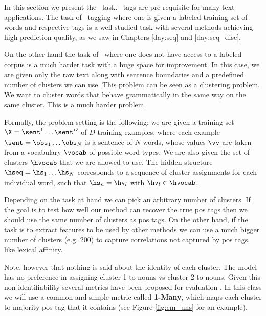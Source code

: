 In this section we present the \posi\ task. \pos\ tags are pre-requisite for many text applications. The task of \pos\ tagging where one is given a labeled training set of words and respective tags is a well studied task with several methods achieving high prediction quality, as we saw in Chapters \ref{day:seq} and \ref{day:seq_disc}. 

On the other hand the task of \posi\ where one does not have access to a labeled corpus is a much harder task with a huge space for improvement. In this case, we are given only the raw text along with sentence boundaries and a predefined number of clusters we can use. This problem can be seen as a clustering problem. We want to cluster words that behave grammatically in the same way on the same cluster. This is a much harder problem.

Formally, the problem setting is the following: we are given a training set $\X = \sent^1 \ldots \sent^D$ of $D$ training examples, where each example $\sent = \obs_1 \ldots \obs_N$ is a sentence of $N$ words, whose values $\vv$ are taken from a vocabulary $\vocab$ of possible word types. We are also given the set of clusters $\hvocab$ that we are allowed to use. The hidden structure $\hseq = \hs_1 \ldots \hs_N$ corresponds to a sequence of cluster assignments for each individual word, such that $\hs_n = \hv_l$ with $\hv_l \in \hvocab$. 

Depending on the task at hand we can pick an arbitrary number of clusters. If the goal is to test how well our method can recover the true pos tags then we should use the same number of clusters as pos tags. On the other hand, if the task is to extract features to be used by other methods we can use a much bigger number of clusters (e.g. 200) to capture correlations not captured by pos tags, like lexical affinity. 

Note, however that nothing is said about the identity of each cluster. The model has no preference in assigning cluster 1 to nouns vs cluster 2 to nouns. Given this non-identifiability several metrics have been proposed for evaluation \citep{Reichart09,haghighi2006naacl,Meila07,RosenbergH07}. In this class we will use a common and simple metric called \textbf{1-Many}, which maps each cluster to majority pos tag that it contains (see Figure \ref{fig:cm_uns} for an example). 

